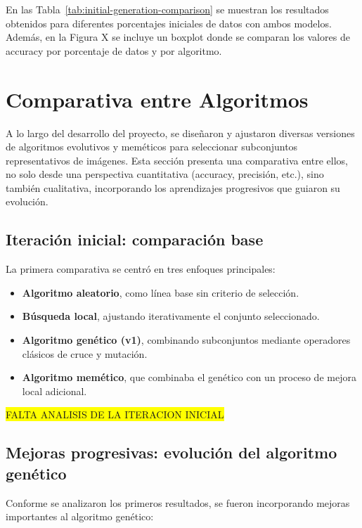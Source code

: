En las Tabla~\ref{tab:initial-generation-comparison} se muestran los resultados obtenidos para diferentes porcentajes iniciales de datos con ambos modelos.
Además, en la Figura X se incluye un boxplot donde se comparan los valores de accuracy por porcentaje de datos y por algoritmo.

\section{Comparativa entre Algoritmos}\label{sec:comparativa-entre-algoritmos}
A lo largo del desarrollo del proyecto, se diseñaron y ajustaron diversas versiones de algoritmos evolutivos y meméticos para seleccionar subconjuntos representativos de imágenes. Esta sección presenta una comparativa entre ellos, no solo desde una perspectiva cuantitativa (accuracy, precisión, etc.), sino también cualitativa, incorporando los aprendizajes progresivos que guiaron su evolución.

\subsection{Iteración inicial: comparación base}\label{sec:iteracion-inicial-comparacion-base}
La primera comparativa se centró en tres enfoques principales:

\begin{itemize}
    \item \textbf{Algoritmo aleatorio}, como línea base sin criterio de selección.
    \item \textbf{Búsqueda local}, ajustando iterativamente el conjunto seleccionado.
    \item \textbf{Algoritmo genético (v1)}, combinando subconjuntos mediante operadores clásicos de cruce y mutación.
    \item \textbf{Algoritmo memético}, que combinaba el genético con un proceso de mejora local adicional.
\end{itemize}

\colorbox{yellow}{FALTA ANALISIS DE LA ITERACION INICIAL}

\subsection{Mejoras progresivas: evolución del algoritmo genético}\label{sec:mejoras-progresivas-evolucion-algoritmo-genetico}
Conforme se analizaron los primeros resultados, se fueron incorporando mejoras importantes al algoritmo genético:

